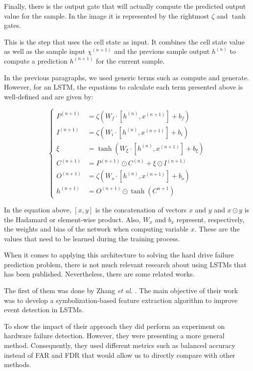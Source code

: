 Finally, there is the output gate that will actually compute the predicted output value for the sample.
In the image it is represented by the rightmost $\zeta$ and $\tanh$ gates.

This is the step that uses the cell state as input.
It combines the cell state value as well as the sample input $\chi^{(n+1)}$ and the previous sample output $h^{(n)}$ to compute a prediction $h^{(n+1)}$ for the current sample. 

In the previous paragraphs, we used generic terms such as compute and generate.
However, for an LSTM, the equations to calculate each term presented above is well-defined and are given by:

\begin{equation}\label{eq:lstm_calculations}
    \begin{cases}
        P^{(n+1)} &= \zeta(W_f\cdot[h^{(n)}, x^{(n+1)}] + b_f) \\
        I^{(n+1)} &= \zeta(W_i\cdot[h^{(n)}, x^{(n+1)}] + b_i) \\
        \xi &= \tanh(W_\xi\cdot[h^{(n)}, x^{(n+1)}] + b_\xi) \\
        C^{(n+1)} &= P^{(n+1)} \odot C^{(n)} + \xi \odot I^{(n+1)} \\
        O^{(n+1)} &= \zeta(W_o\cdot[h^{(n)}, x^{(n+1)}] + b_o) \\
        h^{(n+1)} &= O^{(n+1)} \odot \tanh(C^{n+1})
    \end{cases}
\end{equation}

In the equation above, $[x, y]$ is the concatenation of vectors $x$ and $y$ and $x \odot y$ is the Hadamard or element-wise product.
Also, $W_x$ and $b_x$ represent, respectively, the weights and bias of the network when computing variable $x$.
These are the values that need to be learned during the training process.

When it comes to applying this architecture to solving the hard drive failure prediction problem, there is not much relevant research about using LSTMs that has been published.
Nevertheless, there are some related works.

The first of them was done by Zhang \textit{et al.} \cite{zhang2017deep}.
The main objective of their work was to develop a symbolization-based feature extraction algorithm to improve event detection in LSTMs.

To show the impact of their approach they did perform an experiment on hardware failure detection.
However, they were presenting a more general method.
Consequently, they used different metrics such as balanced accuracy instead of FAR and FDR that would allow us to directly compare with other methods.

